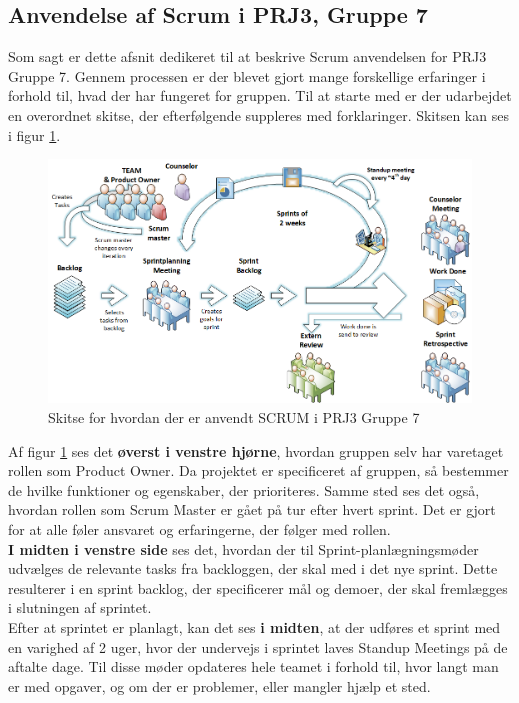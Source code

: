 \documentclass[Rapport/Rapport_main.tex]{subfiles}
\begin{document}
\subsection{Anvendelse af Scrum i PRJ3, Gruppe 7}
Som sagt er dette afsnit dedikeret til at beskrive Scrum anvendelsen for PRJ3 Gruppe 7. Gennem processen er der blevet gjort mange forskellige erfaringer i forhold til, hvad der har fungeret for gruppen. Til at starte med er der udarbejdet en overordnet skitse, der efterfølgende suppleres med forklaringer. Skitsen kan ses i figur \ref{fig:rap_scrum_usage}.
\begin{figure}[H]
    \centering
    \includegraphics[width=\textwidth]{Processdokument/graphics/Scrum_usage.png}
    \caption{Skitse for hvordan der er anvendt SCRUM i PRJ3 Gruppe 7}
    \label{fig:rap_scrum_usage}
\end{figure}
Af figur \ref{fig:rap_scrum_usage} ses det \textbf{øverst i venstre hjørne}, hvordan gruppen selv har varetaget rollen som Product Owner. Da projektet er specificeret af gruppen, så bestemmer de hvilke funktioner og egenskaber, der prioriteres. Samme sted ses det også, hvordan rollen som Scrum Master er gået på tur efter hvert sprint. Det er gjort for at alle føler ansvaret og erfaringerne, der følger med rollen.\\
\textbf{I midten i venstre side} ses det, hvordan der til Sprint-planlægningsmøder udvælges de relevante tasks fra backloggen, der skal med i det nye sprint. Dette resulterer i en sprint backlog,  der specificerer mål og demoer, der skal fremlægges i slutningen af sprintet.\\
Efter at sprintet er planlagt, kan det ses \textbf{i midten}, at der udføres et sprint med en varighed af 2 uger, hvor der undervejs i sprintet laves Standup Meetings på de aftalte dage. Til disse møder opdateres hele teamet i forhold til, hvor langt man er med opgaver, og om der er problemer, eller mangler hjælp et sted.\\
\end{document}
